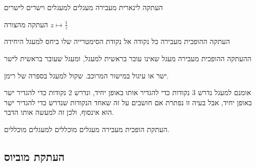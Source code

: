 \documentclass{tstextbook}
\begin{document}
\begin{proposition}
העתקה לינארית מעבירה מעגלים למעגלים וישרים לישרים

\end{proposition}
\begin{definition}
העתקה מהצורה \(z\mapsto \frac{1}{z}\)

\end{definition}
\begin{proposition}
העתקה ההופכית מעבירה כל נקודה אל נקודת הסימטרייה שלו ביחס למעגל היחידה

\end{proposition}
\begin{proposition}
ההעתקה ההופכית מעבירה מעגל שאינו עובר בראשית למעגל, ומעגל שעובר בראשית לישר

\end{proposition}
\begin{definition}
ישר או עיגול במישור המרוכב. שקול למעגל בספרה של רימן.

\end{definition}
\begin{remark}
אומנם למעגל נדרש 3 נקודות כדי להגדיר אותו באופן יחיד, ונדרש 2 נקודות כדי להגדיר ישר באופן יחיד, אבל בעיה זו נפתרת אם חושבים על זה שאחד הנקודות שנדרש כדי להגדיר ישר הוא אינסוף, ולכן זה למעשה אותו הדבר.

\end{remark}
\begin{corollary}
העתקת הופכית מעבירה מעגלים מוכללים למעגלים מוכללים.

\end{corollary}
\subsection{העתקת מוביוס}
\end{document}
